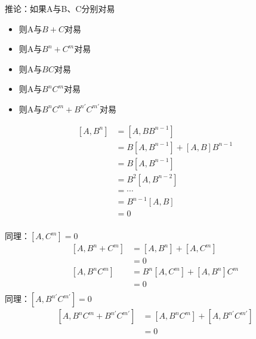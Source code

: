 \begin{frame} 
    \begin{atcbox}{推论：如果A与B、C分别对易}
        \begin{itemize}
            \item 则A与$B+C$对易
            \item 则A与$B^n+C^m$对易
            \item 则A与$BC$对易
            \item 则A与$B^nC^m$对易
            \item 则A与$B^nC^m+B^{n'}C^{m'}$对易
        \end{itemize}
    \end{atcbox}
\end{frame} 

\begin{frame} [allowframebreaks=]
     \证 
        \begin{equation*}
            \begin{split} 
             [A,B^{n}]&=[A,BB^{n-1}] \\
             &=B[A,B^{n-1}]+[A,B]B^{n-1}\\
             &=B[A,B^{n-1}] \\
             &=B^2[A,B^{n-2}]\\
             &=\cdots\\
             &=B^{n-1}[A,B]\\
             &= 0\\
            \end{split}  
        \end{equation*}  
     
        同理：$[A,C^{m}]=0$\\
        \begin{equation*}
            \begin{split} 
            [A,B^{n}+C^{m}] &= [A,B^{n}]+[A,C^{m}]\\
            &=0 \\
            [A,B^{n}C^{m}] &= B^{n}[A,C^{m}] + [A,B^{n}] C^{m}\\
            &=0 \\
        \end{split}  
        \end{equation*}
        同理：$[A,B^{n'}C^{m'}]=0$\\
        \begin{equation*}
            \begin{split} 
            [A,B^{n}C^{m}+B^{n'}C^{m'}] &= [A,B^{n}C^{m}]+[A,B^{n'}C^{m'}]\\
            &=0\\
        \end{split}  
        \end{equation*}
\end{frame} 


